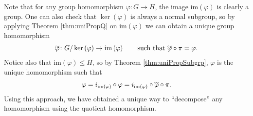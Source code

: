 \documentclass[math]{amznotes}
\renewcommand\widetilde[1]{\ThisStyle{%
  \setbox0=\hbox{$\SavedStyle#1$}%
  \stackengine{1pt-\LMpt}{$\SavedStyle#1$}{%
    \stretchto{\scaleto{\SavedStyle\mkern.2mu\sim}{.5467\wd0}}{.5\ht0}%
  }{O}{c}{F}{T}{S}%
}}
\theoremstyle{remark}
\newcommand{\kernel}[1]{\ker\left(#1\right)}
\newcommand{\img}[1]{\mathrm{im}\left(#1\right)}
\newcommand{\0}{\mathbf{0}}
\newcommand{\1}{\mathbf{1}}
\begin{document}
Note that for any group homomorphism $\varphi \colon G \to H$, the image $\img{\varphi}$ is clearly a group. One can also check that $\kernel{\varphi}$ is always a normal subgroup, so by applying Theorem \ref{thm:uniPropQ} on $\img{\varphi}$ we can obtain a unique group homomorphism 
\begin{equation*}
    \widetilde{\varphi} \colon G \slash \kernel{\varphi} \to \img{\varphi} \qquad\textrm{such that } \widetilde{\varphi} \circ \pi = \varphi.
\end{equation*}
Notice also that $\img{\varphi} \leq H$, so by Theorem \ref{thm:uniPropSubgrp}, $\varphi$ is the unique homomorphism such that 
\begin{equation*}
    \varphi = i_{\img{\varphi}} \circ \varphi = i_{\img{\varphi}} \circ \widetilde{\varphi} \circ \pi.
\end{equation*}
Using this approach, we have obtained a unique way to ``decompose'' any homomorphism using the quotient homomorphism.
\end{document}
